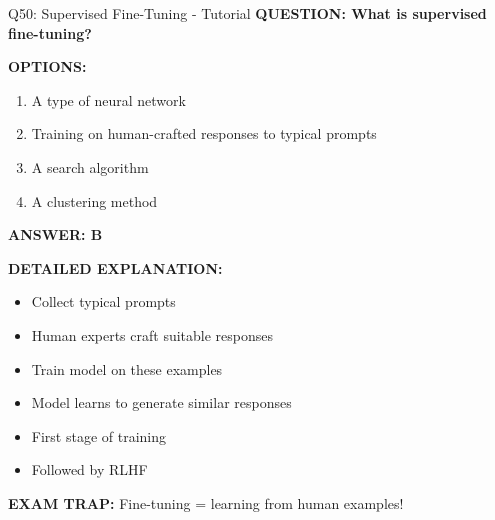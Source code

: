 \documentclass[8pt]{beamer}
\begin{document}
	\begin{frame}{Q50: Supervised Fine-Tuning - Tutorial}
		\fontsize{6.5}{7.5}\selectfont
		\textbf{QUESTION: What is supervised fine-tuning?}
		
		\vspace{0.1cm}
		\textbf{OPTIONS:}
		\begin{enumerate}
			\item A type of neural network
			\item Training on human-crafted responses to typical prompts
			\item A search algorithm
			\item A clustering method
		\end{enumerate}
		
		\vspace{0.1cm}
		\textcolor{myblue}{\textbf{ANSWER: B}}
		
		\vspace{0.1cm}
		\textbf{DETAILED EXPLANATION:}
		\begin{itemize}
			\item Collect typical prompts
			\item Human experts craft suitable responses
			\item Train model on these examples
			\item Model learns to generate similar responses
			\item First stage of training
			\item Followed by RLHF
		\end{itemize}
		
		\vspace{0.1cm}
		\textcolor{myred}{\textbf{EXAM TRAP:}} Fine-tuning = \textcolor{myblue}{learning from human examples}!
	\end{frame}
	
	
\end{document}
